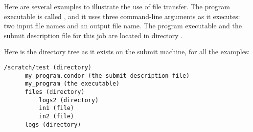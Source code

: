Here are several examples to illustrate the use of file transfer.
The program executable is called ,
and it uses three command-line arguments as it executes: 
two input file names and an output file name.
The program executable and the submit description file 
for this job are located in directory
. 

Here is the directory tree as it exists on the submit machine,
for all the examples:
\begin{verbatim}
/scratch/test (directory)
      my_program.condor (the submit description file)
      my_program (the executable)
      files (directory)
          logs2 (directory)
          in1 (file)
          in2 (file)
      logs (directory)
\end{verbatim}


